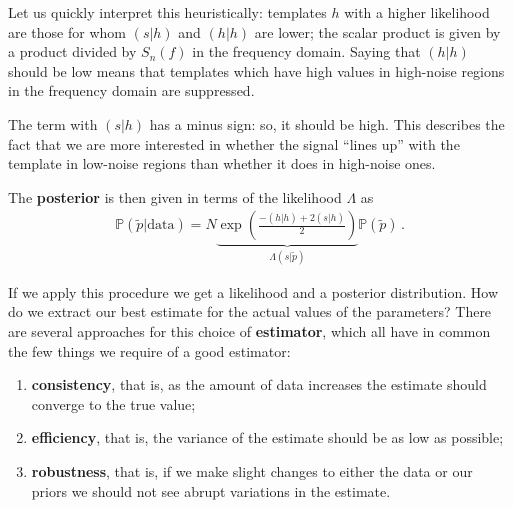 \documentclass[main.tex]{subfiles}
\begin{document}
Let us quickly interpret this heuristically: templates \(h\) with a higher likelihood are those for whom \((s|h)\) and \((h|h)\) are lower; the scalar product is given by a product divided by \(S_n(f)\) in the frequency domain. 
Saying that \((h|h)\) should be low means that templates which have high values in high-noise regions in the frequency domain are suppressed. 

The term with \( (s|h)\) has a minus sign: so, it should be high. This describes the fact that we are more interested in whether the signal ``lines up'' with the template in low-noise regions than whether it does in high-noise ones.

The \textbf{posterior} is then given in terms of the likelihood \(\Lambda \) as
%
\begin{align}
\mathbb{P}(\widetilde{p} | \text{data}) = 
N \underbrace{\exp(\frac{- (h | h) + 2 (s | h)}{2})}_{\Lambda (s | \widetilde{p})} \mathbb{P}(\widetilde{p})
\,.
\end{align}

If we apply this procedure we get a likelihood and a posterior distribution. How do we extract our best estimate for the actual values of the parameters? There are several approaches for this choice of \textbf{estimator}, which all have in common the few things we require of a good estimator: 
\begin{enumerate}
    \item \textbf{consistency}, that is, as the amount of data increases the estimate should converge to the true value;
    \item \textbf{efficiency}, that is, the variance of the estimate should be as low as possible;
    \item \textbf{robustness}, that is, if we make slight changes to either the data or our priors we should not see abrupt variations in the estimate. 
\end{enumerate}
\end{document}
